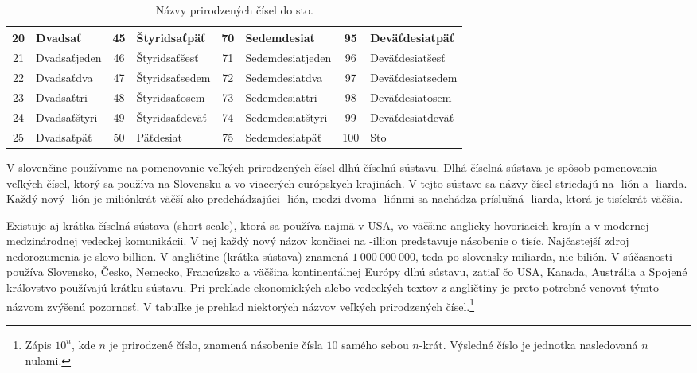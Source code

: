 \documentclass{article}
\begin{document}
\begin{table}[H]
\begin{tabular}{|cl|cl|cl|cl|}
    \hline
    20 & Dvadsať & 45 & Štyridsaťpäť & 70 & Sedemdesiat & 95 & Deväťdesiatpäť \\
    \hline
    21 & Dvadsaťjeden & 46 & Štyridsaťšesť & 71 & Sedemdesiatjeden & 96 & Deväťdesiatšesť \\
    \hline
    22 & Dvadsaťdva & 47 & Štyridsaťsedem & 72 & Sedemdesiatdva & 97 & Deväťdesiatsedem \\
    \hline
    23 & Dvadsaťtri & 48 & Štyridsaťosem & 73 & Sedemdesiattri & 98 & Deväťdesiatosem \\
    \hline
    24 & Dvadsaťštyri & 49 & Štyridsaťdeväť & 74 & Sedemdesiatštyri & 99 & Deväťdesiatdeväť \\
    \hline
    25 & Dvadsaťpäť & 50 & Päťdesiat & 75 & Sedemdesiatpäť & 100 & Sto \\
    \hline
  \end{tabular}
  \caption{Názvy prirodzených čísel do sto.}
\end{table}

V slovenčine používame na pomenovanie veľkých prirodzených čísel dlhú číselnú sústavu. Dlhá číselná sústava je spôsob pomenovania veľkých čísel, ktorý sa používa na Slovensku a vo viacerých európskych krajinách. V tejto sústave sa názvy čísel striedajú na -lión a -liarda. Každý nový -lión je miliónkrát väčší ako predchádzajúci -lión, medzi dvoma -liónmi sa nachádza príslušná -liarda, ktorá je tisíckrát väčšia.

Existuje aj krátka číselná sústava (short scale), ktorá sa používa najmä v USA, vo väčšine anglicky hovoriacich krajín a v modernej medzinárodnej vedeckej komunikácii. V nej každý nový názov končiaci na -illion predstavuje násobenie o tisíc. Najčastejší zdroj nedorozumenia je slovo billion. V angličtine (krátka sústava) znamená \(1\ 000\ 000\ 000\), teda po slovensky miliarda, nie bilión. V súčasnosti používa Slovensko, Česko, Nemecko, Francúzsko a väčšina kontinentálnej Európy dlhú sústavu, zatiaľ čo USA, Kanada, Austrália a Spojené kráľovstvo používajú krátku sústavu. Pri preklade ekonomických alebo vedeckých textov z angličtiny je preto potrebné venovať týmto názvom zvýšenú pozornosť. V tabuľke je prehľad niektorých názvov veľkých prirodzených čísel.\footnote{Zápis \(10^n\), kde \(n\) je prirodzené číslo, znamená násobenie čísla \(10\) samého sebou \(n\)-krát. Výsledné číslo je jednotka nasledovaná \(n\) nulami.}
\end{document}
